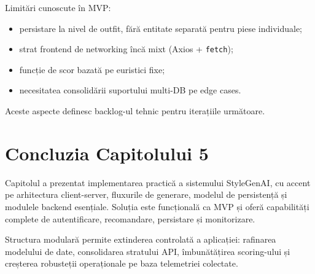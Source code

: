 Limitări cunoscute în MVP:
\begin{itemize}
    \item persistare la nivel de outfit, fără entitate separată pentru piese individuale;
    \item strat frontend de networking încă mixt (Axios + \texttt{fetch});
    \item funcție de scor bazată pe euristici fixe;
    \item necesitatea consolidării suportului multi-DB pe edge cases.
\end{itemize}

Aceste aspecte definesc backlog-ul tehnic pentru iterațiile următoare.

\section*{Concluzia Capitolului 5}

Capitolul a prezentat implementarea practică a sistemului StyleGenAI, cu accent pe arhitectura client-server, fluxurile de generare, modelul de persistență și modulele backend esențiale. Soluția este funcțională ca MVP și oferă capabilități complete de autentificare, recomandare, persistare și monitorizare.

Structura modulară permite extinderea controlată a aplicației: rafinarea modelului de date, consolidarea stratului API, îmbunătățirea scoring-ului și creșterea robusteții operaționale pe baza telemetriei colectate.
